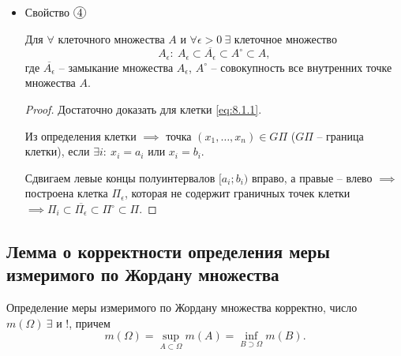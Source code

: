\begin{itemize}
    \item Свойство $ \circled{4} $
          \begin{statement}
              Для $ \forall $ клеточного множества $ A $ и $ \forall \epsilon > 0 \ \exists $ клеточное множество
              \[
                  A_\epsilon : \ A_\epsilon \subset \overline{A_\epsilon} \subset A^\circ \subset A,
              \]
              где $ \overline{A_\epsilon} $ -- замыкание множества $ A_\epsilon $, $ A^\circ $ -- совокупность все внутренних точке множества $ A $.
          \end{statement}
          \begin{proof}
              Достаточно доказать для клетки \ref{eq:8.1.1}.

              Из определения клетки $ \implies $ точка $ (x_1,\ldots,x_n) \in G\Pi $ ($ G\Pi $ -- граница клетки), если $ \exists i : \ x_i = a_i $ или $ x_i = b_i $.

              Сдвигаем левые концы полуинтервалов $ [a_i;b_i) $ вправо, а правые -- влево $ \implies $ построена клетка $ \Pi_\epsilon $, которая не содержит граничных точек клетки $ \implies \Pi_i \subset \overline{\Pi_\epsilon} \subset \Pi^\circ \subset \Pi $.
          \end{proof}
\end{itemize}

\setcounter{subsection}{132}

\subsection{Лемма о корректности определения меры измеримого по Жордану множества}

\begin{lemma}
    Определение меры измеримого по Жордану множества корректно, число $ m(\Omega) \ \exists $ и $ ! $, причем
    \[
        m(\Omega) = \underset{A\subset\Omega}{\sup}m(A) = \underset{B\supset\Omega}{\inf}m(B).
    \]
\end{lemma}

